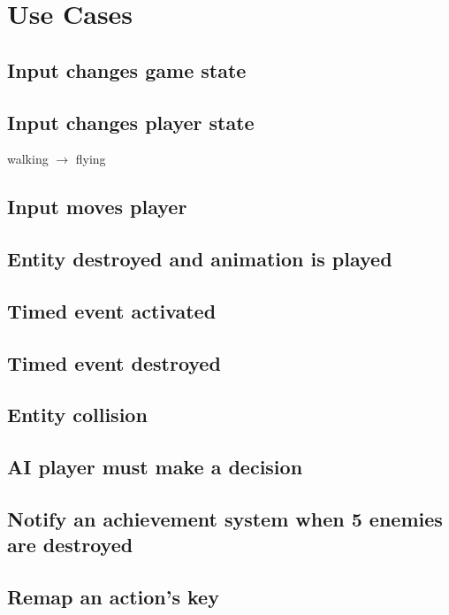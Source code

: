 \documentclass[12pt]{article}
\begin{document}
\section{Use Cases}
\subsection{Input changes game state}
\subsection{Input changes player state}
walking $\rightarrow$ flying
\subsection{Input moves player}
\subsection{Entity destroyed and animation is played}
\subsection{Timed event activated}
\subsection{Timed event destroyed}
\subsection{Entity collision}
\subsection{AI player must make a decision}
\subsection{Notify an achievement system when 5 enemies are destroyed}
\subsection{Remap an action's key}
\end{document}
